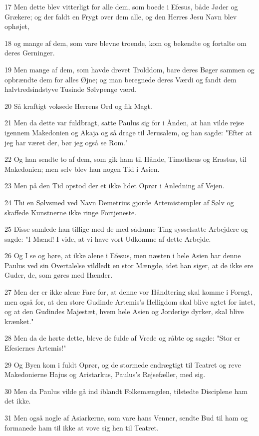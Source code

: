 \par 17 Men dette blev vitterligt for alle dem, som boede i Efesus, både Jøder og Grækere; og der faldt en Frygt over dem alle, og den Herres Jesu Navn blev ophøjet,
\par 18 og mange af dem, som vare blevne troende, kom og bekendte og fortalte om deres Gerninger.
\par 19 Men mange af dem, som havde drevet Trolddom, bare deres Bøger sammen og opbrændte dem for alles Øjne; og man beregnede deres Værdi og fandt dem halvtredsindstyve Tusinde Sølvpenge værd.
\par 20 Så kraftigt voksede Herrens Ord og fik Magt.
\par 21 Men da dette var fuldbragt, satte Paulus sig for i Ånden, at han vilde rejse igennem Makedonien og Akaja og så drage til Jerusalem, og han sagde: "Efter at jeg har været der, bør jeg også se Rom."
\par 22 Og han sendte to af dem, som gik ham til Hånde, Timotheus og Erastus, til Makedonien; men selv blev han nogen Tid i Asien.
\par 23 Men på den Tid opstod der et ikke lidet Oprør i Anledning af Vejen.
\par 24 Thi en Sølvsmed ved Navn Demetrius gjorde Artemistempler af Sølv og skaffede Kunstnerne ikke ringe Fortjeneste.
\par 25 Disse samlede han tillige med de med sådanne Ting sysselsatte Arbejdere og sagde: "I Mænd! I vide, at vi have vort Udkomme af dette Arbejde.
\par 26 Og I se og høre, at ikke alene i Efesus, men næsten i hele Asien har denne Paulus ved sin Overtalelse vildledt en stor Mængde, idet han siger, at de ikke ere Guder, de, som gøres med Hænder.
\par 27 Men der er ikke alene Fare for, at denne vor Håndtering skal komme i Foragt, men også for, at den store Gudinde Artemis's Helligdom skal blive agtet for intet, og at den Gudindes Majestæt, hvem hele Asien og Jorderige dyrker, skal blive krænket."
\par 28 Men da de hørte dette, bleve de fulde af Vrede og råbte og sagde: "Stor er Efesiernes Artemis!"
\par 29 Og Byen kom i fuldt Oprør, og de stormede endrægtigt til Teatret og reve Makedonierne Hajus og Aristarkus, Paulus's Rejsefæller, med sig.
\par 30 Men da Paulus vilde gå ind iblandt Folkemængden, tilstedte Disciplene ham det ikke.
\par 31 Men også nogle af Asiarkerne, som vare hans Venner, sendte Bud til ham og formanede ham til ikke at vove sig hen til Teatret.

